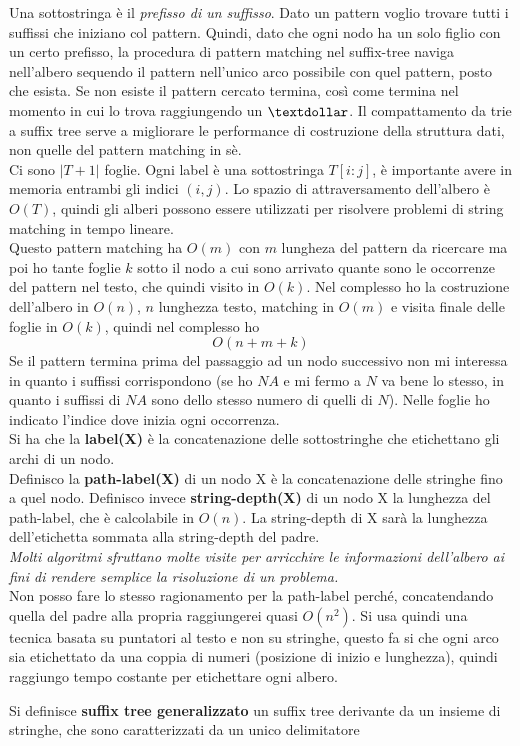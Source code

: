 \documentclass[a4paper,12pt, oneside]{book}
\begin{document}
Una sottostringa è il \textit{prefisso di un suffisso}. Dato un
pattern voglio trovare tutti i suffissi che iniziano col
pattern. Quindi, dato che ogni nodo ha un solo figlio con un certo
prefisso, la procedura di pattern matching nel suffix-tree naviga
nell'albero sequendo il pattern nell'unico arco possibile con quel
pattern, posto che esista. Se non esiste il pattern cercato termina,
così come termina nel momento in cui lo trova raggiungendo un
$\textdollar$. Il compattamento da trie a suffix tree serve a
migliorare le performance di costruzione della struttura dati, non
quelle del pattern matching in sè. \\
Ci sono $|T + 1|$ foglie. Ogni label è una sottostringa $T [i : j]$,
è importante avere in memoria entrambi
gli indici $(i, j)$. Lo spazio di attraversamento dell’albero è $O(T )$,
quindi gli alberi possono essere
utilizzati per risolvere problemi di string matching in tempo
lineare.\\ 
Questo pattern matching ha $O(m)$ con $m$ lungheza del pattern da
ricercare ma poi ho tante foglie $k$ sotto il nodo a cui sono arrivato
quante sono le occorrenze del pattern nel testo, che quindi visito in
$O(k)$. Nel complesso ho la costruzione dell'albero in $O(n)$, $n$
lunghezza testo, matching in $O(m)$ e visita finale delle foglie in
$O(k)$, quindi nel complesso ho
\[O(n+m+k)\]
Se il pattern termina prima del passaggio ad un nodo successivo non mi
interessa in quanto i suffissi corrispondono (se ho $NA$ e mi fermo a
$N$ va bene lo stesso, in quanto i suffissi di $NA$ sono dello stesso
numero di quelli di $N$). Nelle foglie ho indicato l'indice dove
inizia ogni occorrenza.\\
Si ha che la \textbf{label(X)} è la concatenazione delle sottostringhe
che etichettano gli archi di un nodo.
\\
Definisco la \textbf{path-label(X)} di un nodo X è la concatenazione delle
stringhe fino a quel nodo. Definisco invece \textbf{string-depth(X)} di
un nodo X la lunghezza del path-label, che è calcolabile in $O(n)$. La
string-depth di X sarà la lunghezza dell'etichetta sommata alla
string-depth del padre.
\\
\textit{Molti algoritmi sfruttano molte visite per arricchire le
  informazioni dell'albero ai fini di rendere semplice la risoluzione
  di un problema.}\\
Non posso fare lo stesso ragionamento per la path-label perché,
concatendando quella del padre alla propria raggiungerei quasi
$O(n^2)$. Si usa quindi una tecnica basata su puntatori al testo e non
su stringhe, questo fa si che ogni arco sia etichettato da una coppia
di numeri (posizione di inizio e lunghezza), quindi raggiungo tempo
costante per etichettare ogni albero.
\begin{definizione}
  Si definisce \textbf{suffix tree generalizzato} un suffix tree
  derivante da un insieme di stringhe, che sono caratterizzati da un
  unico delimitatore
\end{definizione}
\end{document}
